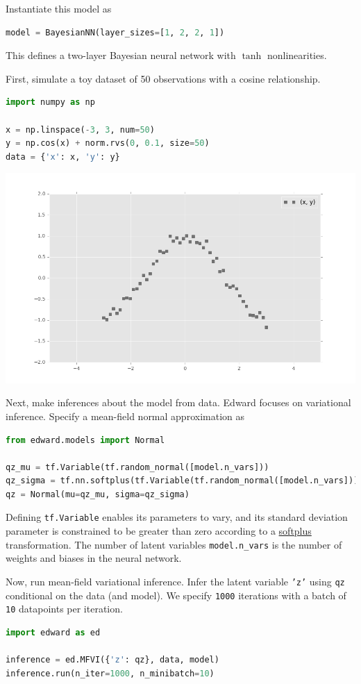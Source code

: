 Instantiate this model as
\begin{lstlisting}[language=Python]
model = BayesianNN(layer_sizes=[1, 2, 2, 1])
\end{lstlisting}
This defines a two-layer Bayesian neural network with $\tanh$
nonlinearities.

First, simulate a toy dataset of 50 observations with a cosine relationship.
\begin{lstlisting}[language=Python]
import numpy as np

x = np.linspace(-3, 3, num=50)
y = np.cos(x) + norm.rvs(0, 0.1, size=50)
data = {'x': x, 'y': y}
\end{lstlisting}
\includegraphics[width=700px]{images/getting-started-fig0.png}

Next, make inferences about the model from data.
Edward focuses on variational inference. Specify a mean-field normal
approximation as
\begin{lstlisting}[language=Python]
from edward.models import Normal

qz_mu = tf.Variable(tf.random_normal([model.n_vars]))
qz_sigma = tf.nn.softplus(tf.Variable(tf.random_normal([model.n_vars])))
qz = Normal(mu=qz_mu, sigma=qz_sigma)
\end{lstlisting}
Defining \texttt{tf.Variable} enables its parameters to vary, and its
standard deviation parameter is constrained to be greater than zero
according to a
\href{https://en.wikipedia.org/wiki/Rectifier_(neural_networks)}{softplus}
transformation.
The number of latent variables \texttt{model.n_vars} is the number
of weights and biases in the neural network.

Now, run mean-field variational inference. Infer the latent variable
\texttt{'z'} using \texttt{qz} conditional on the data (and model). We
specify \texttt{1000} iterations with a batch of \texttt{10}
datapoints per iteration.
\begin{lstlisting}[language=Python]
import edward as ed

inference = ed.MFVI({'z': qz}, data, model)
inference.run(n_iter=1000, n_minibatch=10)
\end{lstlisting}

